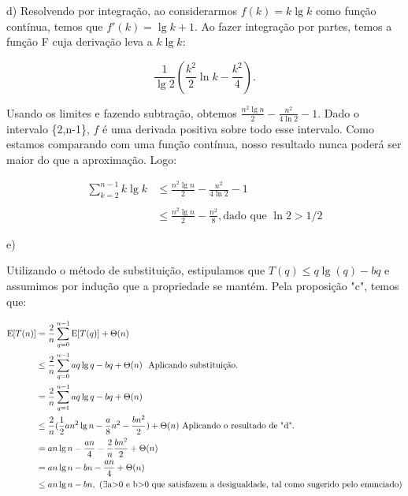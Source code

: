 \documentclass{article}
\begin{document}
d)
Resolvendo por integração, ao considerarmos $f(k) = k\lg k$ como função contínua, temos que $f'(k) = \lg k + 1$. Ao fazer integração por partes, temos a função F cuja derivação leva a $k\lg k$:

$$\frac{1}{\lg 2}(\frac{k^2}{2}\ln k-\frac{k^2}{4}).$$

Usando os limites e fazendo subtração, obtemos $\frac{n^2\lg n}{2} - \frac{n^2}{4\ln 2} - 1$. Dado o intervalo \{2,n-1\}, $f$ é uma derivada positiva sobre todo esse intervalo. Como estamos comparando com uma função contínua, nosso resultado nunca poderá ser maior do que a aproximação. Logo:

$$
\begin{aligned}
\sum_{k = 2}^{n - 1} k\lg k
& \le \frac{n^2\lg n}{2} - \frac{n^2}{4\ln 2} - 1 \\\\
& \le \frac{n^2\lg n}{2} - \frac{n^2}{8}, \text{dado que $\ln 2 > 1 / 2$}
\end{aligned}
$$

e)

Utilizando o método de substituição, estipulamos que $T(q) \le q \lg(q)-bq$ e assumimos por indução que a propriedade se mantém. Pela proposição "c", temos que:

\begin{align*}
\text E[T(n)]
& = \frac{2}{n} \sum_{q=0}^{n-1} \text E[T(q)] + \Theta(n) \\
& \le \frac{2}{n} \sum_{q=0}^{n-1}aq\lg q-bq + \Theta(n)\ \  \text{Aplicando substituição.}\\
& = \frac{2}{n} \sum_{q=1}^{n-1}aq\lg q -bq + \Theta(n) \\
& \le \frac{2}{n}(\frac{1}{2}an^2\lg n - \frac{a}{8}n^2 -\frac{bn^2}{2}) + \Theta(n)\  \text{Aplicando o resultado de "d".}\\
& = an\lg n -\frac{an}{4} - \frac{2}{n}\frac{bn^2}{2} + \Theta(n) \\
& = an\lg n - bn -\frac{an}{4} + \Theta(n) \\ 
& \le an\lg n - bn,\ (\exists \text{a$>$0 e b$>$0 que satisfazem a desigualdade, tal como sugerido pelo enunciado})\\
\end{align*}
\end{document}
